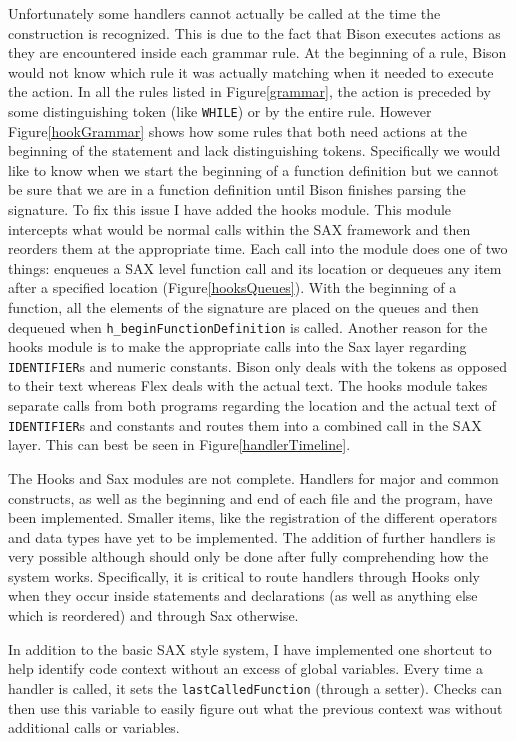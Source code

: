 \documentclass[12pt]{report}
\def\lstlistingname{Figure}
\newcommand{\refCode}{\lstlistingname \hspace{1mm}}
\begin{document}
Unfortunately some handlers cannot actually be called at the time the construction is recognized. This 
is due to the fact that Bison executes actions as they are encountered inside each grammar rule. At the 
beginning of a rule, Bison would not know which rule it was actually matching when it needed to 
execute the action. In all the rules listed in \refCode \ref{grammar}, the action is preceded by some 
distinguishing token (like \lstinline{WHILE}) or by the entire rule. However \refCode \ref{hookGrammar} 
shows how some rules that both need actions at the beginning of the statement and lack distinguishing 
tokens. Specifically we would like to know when we start the beginning of a function definition but we 
cannot be sure that we are in a function definition until Bison finishes parsing the signature. To fix this 
issue I have added the hooks module. This module intercepts what would be normal calls within the 
SAX framework and then reorders them at the appropriate time. Each call into the module does one of 
two things: enqueues a SAX level function call and its location or dequeues any item after a specified 
location (\refCode \ref{hooksQueues}). With the beginning of a function, all the elements of the 
signature are placed on the queues and then dequeued when \lstinline{h_beginFunctionDefinition} is 
called. Another reason for the hooks module is to make the appropriate calls into the Sax layer 
regarding \lstinline{IDENTIFIER}s and numeric constants. Bison only deals with the tokens as opposed 
to their text whereas Flex deals with the actual text. The hooks module takes separate calls from both 
programs regarding the location and the actual text of \lstinline{IDENTIFIER}s and constants and routes 
them into a combined call in the SAX layer. This can best be seen in \refCode \ref{handlerTimeline}.

The Hooks and Sax modules are not complete. Handlers for major and common constructs, as well as 
the beginning and end of each file and the program, have been implemented. Smaller items, like the 
registration of the different operators and data types have yet to be implemented. The addition of further 
handlers is very possible although should only be done after fully comprehending how the system 
works. Specifically, it is critical to route handlers through Hooks only when they occur inside statements 
and declarations (as well as anything else which is reordered) and through Sax otherwise.

In addition to the basic SAX style system, I have implemented one shortcut to help identify code context 
without an excess of global variables. Every time a handler is called, it sets the 
\lstinline{lastCalledFunction} (through a setter). Checks can then use this variable to easily figure out 
what the previous context was without additional calls or variables.
\end{document}
